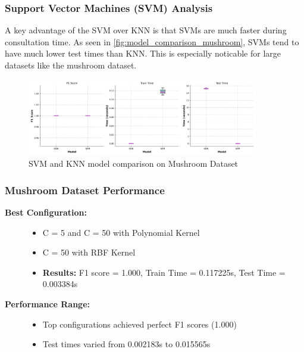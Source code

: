 \subsubsection{Support Vector Machines (SVM) Analysis}
\label{subsubsec:discussion-svm}

A key advantage of the SVM over KNN is that SVMs are much faster during consultation time. As seen in \autoref{fig:model_comparison_mushroom},
SVMs tend to have much lower test times than KNN. This is especially noticable for large datasets like the mushroom dataset.

\begin{figure}
    \centering
    \includegraphics[width=0.9\textwidth]{figures/model_comparison_mushroom.png}
    \caption{SVM and KNN model comparison on Mushroom Dataset}
    \label{fig:model_comparison_mushroom}
\end{figure}

\subsubsection{Mushroom Dataset Performance}

\begin{description}
    \item[\textbf{Best Configuration:}]\leavevmode
        \begin{itemize}
            \item C = 5 and C = 50 with Polynomial Kernel
            \item C = 50 with RBF Kernel
            \item \textbf{Results:} F1 score = 1.000, Train Time = 0.117225s, Test Time = 0.003384s
        \end{itemize}
    
    \item[\textbf{Performance Range:}]\leavevmode
        \begin{itemize}
            \item Top configurations achieved perfect F1 scores (1.000)
            \item Test times varied from 0.002183s to 0.015565s
        \end{itemize}
\end{description}

